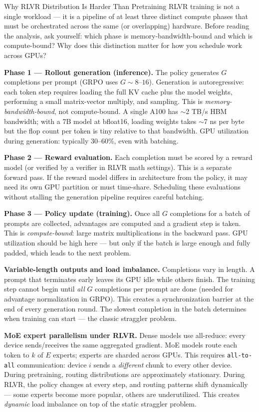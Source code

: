 \begin{thinkfirst}{Why RLVR Distribution Is Harder Than Pretraining}
RLVR training is not a single workload --- it is a pipeline of at least three distinct
compute phases that must be orchestrated across the same (or overlapping) hardware.
Before reading the analysis, ask yourself: which phase is memory-bandwidth-bound and which is
compute-bound?
Why does this distinction matter for how you schedule work across GPUs?

\medskip
\textbf{Phase 1 --- Rollout generation (inference).}
The policy generates $G$ completions per prompt (GRPO uses $G \sim 8$--$16$).
Generation is autoregressive: each token step requires loading the full KV cache plus the model
weights, performing a small matrix-vector multiply, and sampling.
This is \emph{memory-bandwidth-bound}, not compute-bound.
A single A100 has $\sim$2 TB/s HBM bandwidth; with a 7B model at bfloat16, loading weights takes
$\sim$7 ns per byte but the flop count per token is tiny relative to that bandwidth.
GPU utilization during generation: typically 30--60\%, even with batching.

\medskip
\textbf{Phase 2 --- Reward evaluation.}
Each completion must be scored by a reward model (or verified by a verifier in RLVR math settings).
This is a separate forward pass.
If the reward model differs in architecture from the policy, it may need its own GPU partition or
must time-share.
Scheduling these evaluations without stalling the generation pipeline requires careful batching.

\medskip
\textbf{Phase 3 --- Policy update (training).}
Once all $G$ completions for a batch of prompts are collected, advantages are computed and a gradient
step is taken.
This is \emph{compute-bound}: large matrix multiplications in the backward pass.
GPU utilization should be high here --- but only if the batch is large enough and
fully padded, which leads to the next problem.

\medskip
\textbf{Variable-length outputs and load imbalance.}
Completions vary in length.
A prompt that terminates early leaves its GPU idle while others finish.
The training step cannot begin until \emph{all} $G$ completions per prompt are done
(needed for advantage normalization in GRPO).
This creates a synchronization barrier at the end of every generation round.
The slowest completion in the batch determines when training can start --- the classic straggler problem.

\medskip
\textbf{MoE expert parallelism under RLVR.}
Dense models use all-reduce: every device sends/receives the same aggregated gradient.
MoE models route each token to $k$ of $E$ experts; experts are sharded across GPUs.
This requires \texttt{all-to-all} communication: device $i$ sends a \emph{different} chunk to
every other device.
During pretraining, routing distributions are approximately stationary.
During RLVR, the policy changes at every step, and routing patterns shift dynamically ---
some experts become more popular, others are underutilized.
This creates \emph{dynamic} load imbalance on top of the static straggler problem.


\end{thinkfirst}
